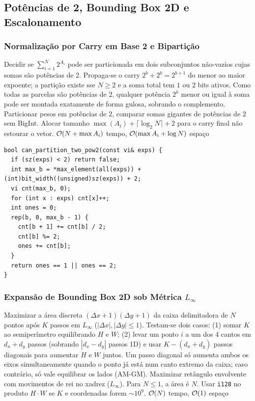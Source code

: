 \subsection{Potências de 2, Bounding Box 2D e Escalonamento}

\subsubsection{Normalização por Carry em Base 2 e Bipartição}
\algobox
  {Decidir se $\sum_{i=1}^N 2^{A_i}$ pode ser particionada em dois subconjuntos não-vazios cujas somas são potências de $2$.}
  {Propaga-se o carry $2^b + 2^b = 2^{b+1}$ do menor ao maior expoente; a partição existe sse $N \ge 2$ e a soma total tem $1$ ou $2$ bits ativos.}
  {Como todas as parcelas são potências de $2$, qualquer potência $2^k$ menor ou igual à soma pode ser montada exatamente de forma gulosa, sobrando o complemento.}
  {Particionar pesos em potências de $2$, comparar somas gigantes de potências de $2$ sem BigInt.}
  {Alocar tamanho $\max(A_i) + \lceil \log_2 N \rceil + 2$ para o carry final não estourar o vetor.}
  {$\mathcal{O}(N + \max A_i)$ tempo, $\mathcal{O}(\max A_i + \log N)$ espaço}

\begin{lstlisting}
bool can_partition_two_pow2(const vi& exps) {
  if (sz(exps) < 2) return false;
  int max_b = *max_element(all(exps)) + (int)bit_width((unsigned)sz(exps)) + 2;
  vi cnt(max_b, 0);
  for (int x : exps) cnt[x]++;
  int ones = 0;
  rep(b, 0, max_b - 1) {
    cnt[b + 1] += cnt[b] / 2;
    cnt[b] %= 2;
    ones += cnt[b];
  }
  return ones == 1 || ones == 2;
}
\end{lstlisting}

\subsubsection{Expansão de Bounding Box 2D sob Métrica $L_\infty$}
\algobox
  {Maximizar a área discreta $(\Delta x + 1)(\Delta y + 1)$ da caixa delimitadora de $N$ pontos após $K$ passos em $L_\infty$ ($|\Delta x|, |\Delta y| \le 1$).}
  {Testam-se dois casos: (1) somar $K$ ao semiperímetro equilibrando $H$ e $W$; (2) levar um ponto $i$ a um dos 4 cantos em $d_x + d_y$ passos (sobrando $|d_x - d_y|$ passos 1D) e usar $K - (d_x + d_y)$ passos diagonais para aumentar $H$ e $W$ juntos.}
  {Um passo diagonal só aumenta ambos os eixos simultaneamente quando o ponto já está num canto extremo da caixa; caso contrário, só vale equilibrar os lados (AM-GM).}
  {Maximizar retângulo envolvente com movimentos de rei no xadrez ($L_\infty$).}
  {Para $N \le 1$, a área é $N$. Usar \texttt{i128} no produto $H \cdot W$ se $K$ e coordenadas forem $\sim 10^9$.}
  {$\mathcal{O}(N)$ tempo, $\mathcal{O}(1)$ espaço}

